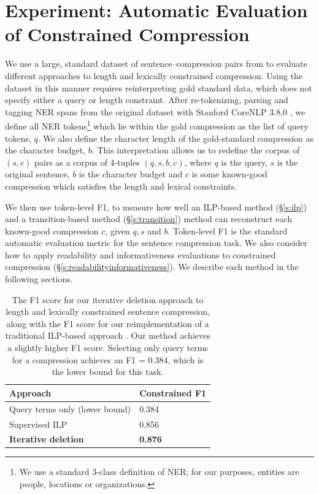 \documentclass[11pt,a4paper]{article}
\begin{document}
\section{Experiment: Automatic Evaluation of Constrained Compression}\label{s:autoeval}

We use a large, standard dataset of sentence--compression pairs from \citet{filippova2013overcoming} to evaluate different approaches to length and lexically constrained compression. Using the dataset in this manner requires reinterpreting gold standard data, which does not specify either a query or length constraint. After re-tokenizing, parsing and tagging NER spans from the original dataset with Stanford CoreNLP 3.8.0 \cite{corenlp}, we define all NER tokens\footnote{We use a standard 3-class definition of NER; for our purposes, entities are people, locations or organizations.} which lie within the gold compression as the list of query tokens, $q$. We also define the character length of the gold-standard compression as the character budget, $b$. This interpretation allows us to redefine the corpus of $(s,c)$ pairs as a corpus of 4-tuples $(q,s,b,c)$, where $q$ is the query, $s$ is the original sentence, $b$ is the character budget and $c$ is some known-good compression which satisfies the length and lexical constraints. 

We then use token-level F1, to measure how well an ILP-based method (\S\ref{s:ilp}) and a transition-based method (\S\ref{s:transition}) method can reconstruct each known-good compression $c$, given $q,s$ and $b$. Token-level F1 is the standard automatic evaluation metric for the sentence compression task. We also consider how to apply readability and informativeness evaluations to constrained compression (\S\ref{s:readabilityinformativeness}). We describe each method in the following sections.
    
\begin{table}[htb!]
\begin{tabular}{ll}
\centering
Approach & Constrained F1  \\ \hline
Query terms only (lower bound) & 0.384    \\
Supervised ILP  & 0.856          \\
 \textbf{Iterative deletion} &  \textbf{0.876}    \\
\end{tabular}
\caption{The F1 score for our iterative deletion approach to length and lexically constrained sentence compression, along with the F1 score for our reimplementation of a traditional ILP-based approach \cite{filippova2013overcoming}. Our method achieves a slightly higher F1 score. Selecting only query terms for a compression achieves an F1 = 0.384, which is the lower bound for this task.}
\end{table}
\end{document}
